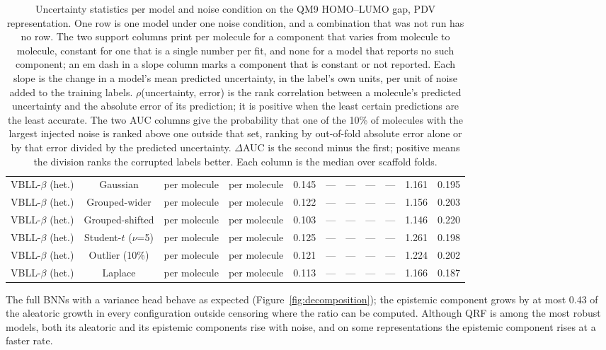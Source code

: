 \begin{table}[!htbp]
\begin{adjustbox}{max width=\textwidth,max totalheight=0.78\textheight}
\begin{tabular}{lcccccccccc}
VBLL-$\beta$ (het.) & Gaussian & per molecule & per molecule & 0.145 & --- & --- & --- & --- & 1.161 & 0.195 \\
VBLL-$\beta$ (het.) & Grouped-wider & per molecule & per molecule & 0.122 & --- & --- & --- & --- & 1.156 & 0.203 \\
VBLL-$\beta$ (het.) & Grouped-shifted & per molecule & per molecule & 0.103 & --- & --- & --- & --- & 1.146 & 0.220 \\
VBLL-$\beta$ (het.) & Student-$t$ ($\nu$=5) & per molecule & per molecule & 0.125 & --- & --- & --- & --- & 1.261 & 0.198 \\
VBLL-$\beta$ (het.) & Outlier (10\%) & per molecule & per molecule & 0.121 & --- & --- & --- & --- & 1.224 & 0.202 \\
VBLL-$\beta$ (het.) & Laplace & per molecule & per molecule & 0.113 & --- & --- & --- & --- & 1.166 & 0.187 \\
\bottomrule
\end{tabular}
\end{adjustbox}
\caption[Uncertainty statistics per model and noise condition on QM9.]{Uncertainty statistics per model and noise condition on the QM9 HOMO--LUMO gap, PDV representation. One row is one model under one noise condition, and a combination that was not run has no row. The two support columns print per molecule for a component that varies from molecule to molecule, constant for one that is a single number per fit, and none for a model that reports no such component; an em dash in a slope column marks a component that is constant or not reported. Each slope is the change in a model's mean predicted uncertainty, in the label's own units, per unit of noise added to the training labels. $\rho$(uncertainty, error) is the rank correlation between a molecule's predicted uncertainty and the absolute error of its prediction; it is positive when the least certain predictions are the least accurate. The two AUC columns give the probability that one of the 10\% of molecules with the largest injected noise is ranked above one outside that set, ranking by out-of-fold absolute error alone or by that error divided by the predicted uncertainty. $\Delta$AUC is the second minus the first; positive means the division ranks the corrupted labels better. Each column is the median over scaffold folds.}
\label{tab:uncertainty}
\end{table}

The full BNNs with a variance head behave as expected (Figure~\ref{fig:decomposition}); the epistemic component grows by at most 0.43 of the aleatoric growth in every configuration outside censoring where the ratio can be computed. Although QRF is among the most robust models, both its aleatoric and its epistemic components rise with noise, and on some representations the epistemic component rises at a faster rate.

